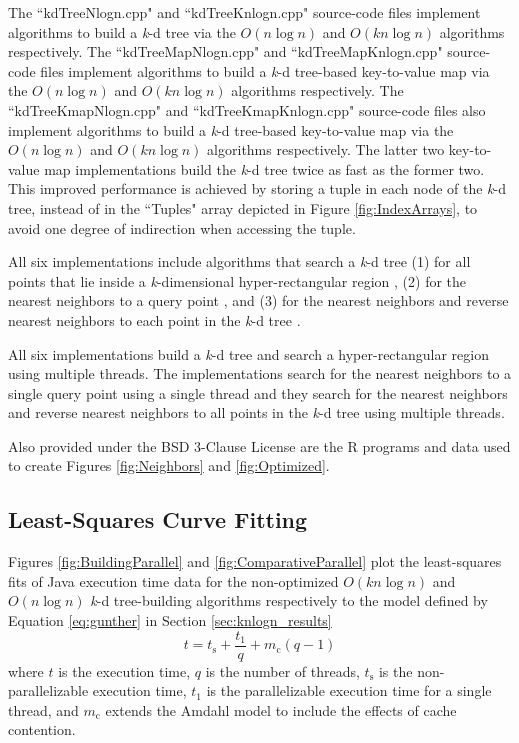 \documentclass{sig-alternate}
\begin{document}
The ``kdTreeNlogn.cpp" and ``kdTreeKnlogn.cpp" source-code files implement algorithms to build a \emph{k}-d tree via the $O\left(n \log n\right)$ and $O\left(kn \log n\right)$ algorithms respectively. The ``kdTreeMapNlogn.cpp" and ``kdTreeMapKnlogn.cpp" source-code files implement algorithms to build a \emph{k}-d tree-based key-to-value map via the $O\left(n \log n\right)$ and $O\left(kn \log n\right)$ algorithms respectively. The ``kdTreeKmapNlogn.cpp" and ``kdTreeKmapKnlogn.cpp" source-code files also implement algorithms to build a \emph{k}-d tree-based key-to-value map via the $O\left(n \log n\right)$ and $O\left(kn \log n\right)$ algorithms respectively. The latter two key-to-value map implementations build the \emph{k}-d tree twice as fast as the former two. This improved performance is achieved by storing a tuple in each node of the \emph{k}-d tree, instead of in the ``Tuples" array depicted in Figure \ref{fig:IndexArrays}, to avoid one degree of indirection when accessing the tuple.

All six implementations include algorithms that search a \emph{k}-d tree (1) for all points that lie inside a \emph{k}-dimensional hyper-rectangular region \cite{Bentley}, (2) for the nearest neighbors to a query point \cite{Friedman}, and (3) for the nearest neighbors and reverse nearest neighbors to each point in the \emph{k}-d tree \cite{Korn}.

All six implementations build a \emph{k}-d tree and search a hyper-rectangular region using multiple threads. The implementations search for the nearest neighbors to a single query point using a single thread and they search for the nearest neighbors and reverse nearest neighbors to all points in the \emph{k}-d tree using multiple threads.

Also provided under the BSD 3-Clause License are the R programs and data used to create Figures \ref{fig:Neighbors} and \ref{fig:Optimized}.

\newpage

\subsection{Least-Squares Curve Fitting}
\label{sec:least_squares}

Figures \ref{fig:BuildingParallel} and \ref{fig:ComparativeParallel} plot the least-squares fits of Java execution time data for the non-optimized $O\left(kn \log n\right)$ and $O\left(n \log n\right)$ \emph{k}-d tree-building algorithms respectively to the model defined by Equation \ref{eq:gunther} in Section \ref{sec:knlogn_results}
\begin{equation*}
t =  t_\mathrm{s} + \frac{t_1}{q} + m_\mathrm{c}\left(q - 1\right)
\end{equation*}
where $t$ is the execution time, $q$ is the number of threads, $t_\mathrm{s}$ is the non-parallelizable execution time, $t_1$ is the parallelizable execution time for a single thread, and $m_\mathrm{c}$ extends the Amdahl model to include the effects of cache contention.
\end{document}
